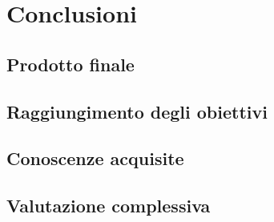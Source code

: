 
\chapter{Conclusioni}
\label{cap:conclusioni}

\section{Prodotto finale}

\section{Raggiungimento degli obiettivi}

\section{Conoscenze acquisite}

\section{Valutazione complessiva}
